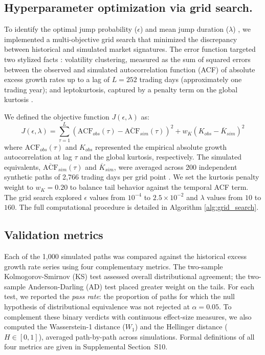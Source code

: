\subsection*{Hyperparameter optimization via grid search.}
To identify the optimal jump probability ($\epsilon$) and mean jump duration ($\lambda$) \cite{merton_jump_1976, kou_jump-diffusion_2002}, we implemented a multi-objective grid search that minimized the discrepancy between historical and simulated market signatures. The error function targeted two stylized facts \cite{cont_empirical_2001, ryden_stylized_1998}: volatility clustering, measured as the sum of squared errors between the observed and simulated autocorrelation function (ACF) of absolute excess growth rates \cite{schwert_why_1989} up to a lag of $L=252$ trading days (approximately one trading year); and leptokurtosis, captured by a penalty term on the global kurtosis \cite{mandelbrot_variation_1963}.

We defined the objective function $J(\epsilon, \lambda)$ as:
\begin{equation}
    J(\epsilon, \lambda) = \sum_{\tau=1}^{L} \left( \text{ACF}_{obs}(\tau) - \overline{\text{ACF}}_{sim}(\tau) \right)^2 + w_K \left( K_{obs} - \overline{K}_{sim} \right)^2
    \label{eq:grid_search}
\end{equation}
where $\text{ACF}_{obs}(\tau)$ and $K_{obs}$ represented the empirical absolute growth autocorrelation at lag $\tau$ and the global kurtosis, respectively. The simulated equivalents, $\overline{\text{ACF}}_{sim}(\tau)$ and $\overline{K}_{sim}$, were averaged across 200 independent synthetic paths of 2,766 trading days per grid point \cite{glasserman_monte_2003}. We set the kurtosis penalty weight to $w_K = 0.20$ to balance tail behavior against the temporal ACF term. The grid search explored $\epsilon$ values from $10^{-4}$ to $2.5\times10^{-2}$ and $\lambda$ values from $10$ to $160$. The full computational procedure is detailed in Algorithm \ref{alg:grid_search}.

\subsection*{Validation metrics}
Each of the 1,000 simulated paths was compared against the historical excess growth rate series using four complementary metrics. The two-sample Kolmogorov-Smirnov (KS) test \cite{kolmogorov_1933, smirnov_1948} assessed overall distributional agreement; the two-sample Anderson-Darling (AD) test \cite{anderson_darling_1952} placed greater weight on the tails. For each test, we reported the \textit{pass rate}: the proportion of paths for which the null hypothesis of distributional equivalence was not rejected at $\alpha = 0.05$. To complement these binary verdicts with continuous effect-size measures, we also computed the Wasserstein-1 distance ($W_1$) and the Hellinger distance ($H \in [0,1]$), averaged path-by-path across simulations. Formal definitions of all four metrics are given in Supplemental Section~S10.

